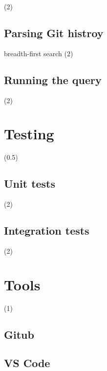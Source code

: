 (2)

\subsection{Parsing Git histroy}

breadth-first search (2)

\subsection{Running the query}

(2)

\section{Testing}

(0.5)

\subsection{Unit tests}

(2)

\subsection{Integration tests}

(2)

\section{Tools}

(1)

\subsection{Gitub}

\subsection{VS Code}